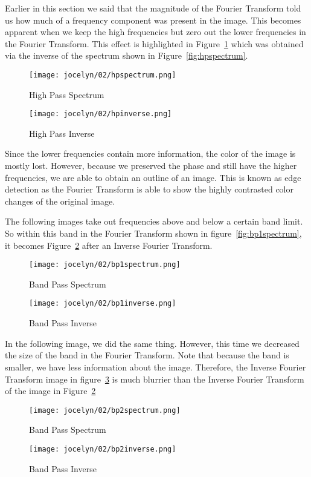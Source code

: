 \documentclass [../article.tex]{subfiles}
\begin{document}
  Earlier in this section we said that the magnitude of the Fourier
  Transform told us how much of a frequency component was present in
  the image.  This becomes apparent when we keep the high
  frequencies but zero out the lower frequencies in the Fourier
  Transform. This effect is highlighted in Figure~\ref{fig:hpinverse}
  which was obtained via the inverse of the spectrum shown in
  Figure~\ref{fig:hpspectrum}.
  \begin{figure}[htbp]
      \texttt{[image: jocelyn/02/hpspectrum.png]}
      \caption{High Pass Spectrum}
      \label{fig:hpspectrum}
    \endminipage\hfill
      \texttt{[image: jocelyn/02/hpinverse.png]}
      \caption{High Pass Inverse}
      \label{fig:hpinverse}
    \endminipage
  \end{figure}

  Since the lower frequencies contain more information, the color of
  the image is mostly lost.  However, because we preserved the phase
  and still have the higher frequencies, we are able to obtain an
  outline of an image.  This is known as edge detection as the
  Fourier Transform is able to show the highly contrasted color
  changes of the original image.

  The following images take out frequencies above and below a
  certain band limit.  So within this band in the Fourier
  Transform shown in figure~\ref{fig:bp1spectrum}, it becomes
  Figure~\ref{fig:bp1inverse} after an Inverse Fourier Transform.
  \begin{figure}[htbp]
      \texttt{[image: jocelyn/02/bp1spectrum.png]}
      \caption{Band Pass Spectrum}
      \label{fig:bp1spectrum}
    \endminipage\hfill
      \texttt{[image: jocelyn/02/bp1inverse.png]}
      \caption{Band Pass Inverse}
      \label{fig:bp1inverse}
    \endminipage
  \end{figure}

  In the following image, we did the same thing.  However, this time
  we decreased the size of the band in the Fourier Transform.  Note
  that because the band is smaller, we have less information about
  the image.  Therefore, the Inverse Fourier Transform image in
  figure~\ref{fig:bp2inverse}
  is much blurrier than the Inverse Fourier Transform of the image
  in Figure~\ref{fig:bp1inverse}
  \begin{figure}[htbp]
      \texttt{[image: jocelyn/02/bp2spectrum.png]}
      \caption{Band Pass Spectrum}
      \label{fig:bp2spectrum}
    \endminipage\hfill
      \texttt{[image: jocelyn/02/bp2inverse.png]}
      \caption{Band Pass Inverse}
      \label{fig:bp2inverse}
    \endminipage
  \end{figure}
\end{document}
